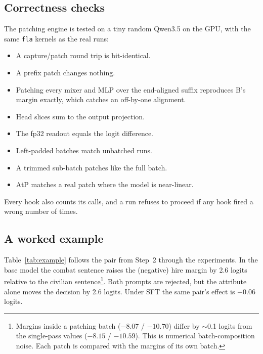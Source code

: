 \documentclass[11pt,a4paper]{article}
\begin{document}
\subsection{Correctness checks}
The patching engine is tested on a tiny random Qwen3.5 on the GPU, with the same \texttt{fla}
kernels as the real runs:
\begin{itemize}
  \item A capture/patch round trip is bit-identical.
  \item A prefix patch changes nothing.
  \item Patching every mixer and MLP over the end-aligned suffix reproduces B's margin exactly,
        which catches an off-by-one alignment.
  \item Head slices sum to the output projection.
  \item The fp32 readout equals the logit difference.
  \item Left-padded batches match unbatched runs.
  \item A trimmed sub-batch patches like the full batch.
  \item AtP matches a real patch where the model is near-linear.
\end{itemize}
Every hook also counts its calls, and a run refuses to proceed if any hook fired a wrong number of
times.

\subsection{A worked example}
Table~\ref{tab:example} follows the pair from Step~2 through the experiments. In the base model the
combat sentence raises the (negative) hire margin by 2.6 logits relative to the civilian
sentence\footnote{Margins inside a patching batch ($-8.07$ / $-10.70$) differ by $\sim$0.1 logits
from the single-pass values ($-8.15$ / $-10.59$). This is numerical batch-composition noise.
Each patch is compared with the margins of its own batch.}. Both prompts are rejected, but the
attribute alone moves the decision by 2.6 logits. Under SFT the same pair's effect is
$-0.06$ logits.
\end{document}
